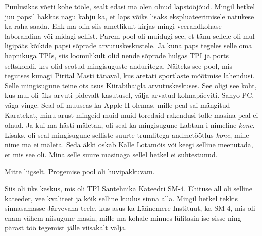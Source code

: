 Puulusikas võeti kohe tööle, sealt edasi ma olen olnud lapstööjõud. Mingil 
hetkel juu papsil hakkas nagu kahju ka, et laps võiks  lisaks 
ekspluateerimisele natukese ka raha saada. Ehk ma olin siis ametlikult kirjas 
mingi veerandkohase laborandina või midagi sellist.  Parem pool oli muidugi 
see, et tänu sellele oli mul ligipääs kõikide papsi sõprade arvutuskeskustele. 
Ja kuna paps tegeles selle oma hapnikuga TPIs, siis loomulikult olid nende 
sõprade hulgas TPI ja ports seltskondi, kes olid seotud mingisuguste 
anduritega. Näiteks see pool, mis tegutses kunagi Pirital Masti tänaval,  kus  
aretati sportlaste mõõtmise lahendusi. Selle mingisugune teine ots asus 
Kiirabihaigla arvutuskeskuses. See oligi see 
koht, kus mul oli üks arvuti pidevalt kasutusel, välja arvatud kolmapäeviti. 
Sanyo PC, väga vinge. Seal oli muuseas ka Apple II 
olemas, mille peal sai mängitud Karatekat, minu arust 
mingeid muid muid toredaid rakendusi tolle masina peal ei olnud. Ja kui ma 
hästi mäletan, oli seal ka mingisugune Labtam-i nimeline \emph{kone}. Lisaks, oli 
seal mingisugune selliste suurte trumlitega andmetöötlus-\emph{kone}, mille 
nime ma ei mäleta. Seda äkki oskab Kalle Lotamõis 
või keegi selline  meenutada, et mis see oli. Mina selle suure masinaga sellel 
hetkel ei suhtestunud. 


Mitte liigselt. Progemise pool oli  huvipakkuvam. 

Siis oli üks keskus, mis oli TPI Santehnika Kateedri SM-4. Ehituse all oli 
selline kateeder, vee kvaliteet ja kõik selline kuulus  sinna alla. Mingil 
hetkel tekkis sinnasamasse Järvevana teele, kus asus ka Läänemere 
Instituut, ka 
SM-4, mis oli  enam-vähem niisugune masin, mille ma kohale 
minnes  lülitasin ise sisse ning pärast töö tegemist jälle viisakalt välja. 

